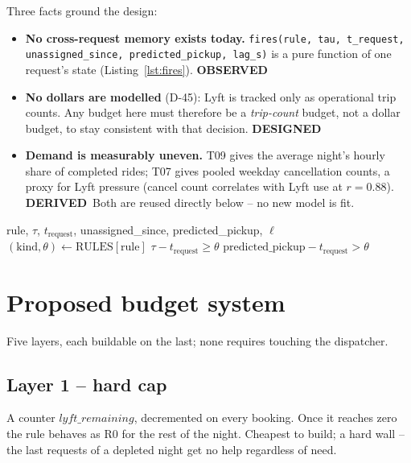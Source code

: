\documentclass[11pt]{article}
\newcommand{\lab}[1]{{\footnotesize\textsf{\textbf{#1}}}}
\newcommand{\OBS}{\lab{OBSERVED}}
\newcommand{\DER}{\lab{DERIVED}}
\newcommand{\DES}{\lab{DESIGNED}}
\begin{document}
Three facts ground the design:
\begin{itemize}
  \item \textbf{No cross-request memory exists today.} \texttt{fires(rule, tau, t\_request, unassigned\_since,
    predicted\_pickup, lag\_s)} is a pure function of one request's state (Listing~\ref{lst:fires}). \OBS
  \item \textbf{No dollars are modelled} (D-45): Lyft is tracked only as operational trip counts. Any budget
    here must therefore be a \emph{trip-count} budget, not a dollar budget, to stay consistent with that
    decision. \DES
  \item \textbf{Demand is measurably uneven.} T09 gives the average night's hourly share of completed rides;
    T07 gives pooled weekday cancellation counts, a proxy for Lyft pressure (cancel count correlates with
    Lyft use at $r=0.88$). \DER\ Both are reused directly below -- no new model is fit.
\end{itemize}

\begin{algorithm}[h]
\caption{Current transfer check, per waiting request (\texttt{src/sim/lyft.py})}
\label{lst:fires}
\begin{algorithmic}
\REQUIRE rule, $\tau$, $t_{\text{request}}$, unassigned\_since, predicted\_pickup, $\ell$
\STATE $(\text{kind}, \theta) \leftarrow \text{RULES}[\text{rule}]$ 
  \RETURN $\tau - t_{\text{request}} \ge \theta$
  \RETURN $\text{predicted\_pickup} - t_{\text{request}} > \theta$
\ENDIF
\end{algorithmic}
\end{algorithm}

\section{Proposed budget system}
\label{sec:system}

Five layers, each buildable on the last; none requires touching the dispatcher.

\subsection{Layer 1 -- hard cap}
A counter $\textit{lyft\_remaining}$, decremented on every booking. Once it reaches zero the rule behaves as
R0 for the rest of the night. Cheapest to build; a hard wall -- the last requests of a depleted night get no
help regardless of need.
\end{document}
